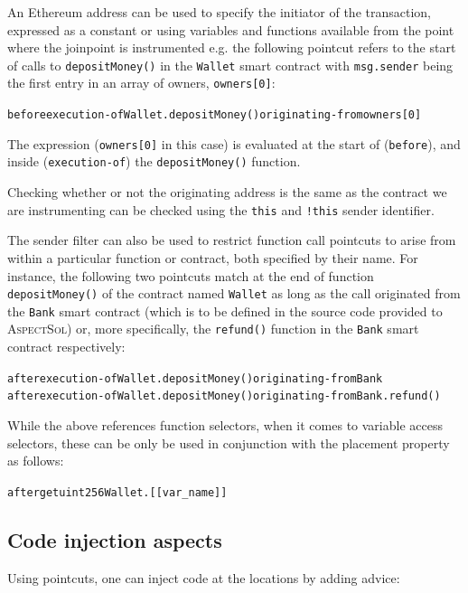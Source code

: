 \documentclass{article}
\newcommand{\AspectSol}{\textsc{AspectSol}\xspace}
\begin{document}
\begin{itemize}
    An Ethereum address can be used to specify the initiator of the transaction, expressed as a constant or using variables and functions available from the point where the joinpoint is instrumented e.g. the following pointcut refers to the start of calls to \texttt{depositMoney()} in the \texttt{Wallet} smart contract with \texttt{msg.sender} being the first entry in an array of owners, \texttt{owners[0]}:  

	\begin{alltt}
before execution-of Wallet.depositMoney() originating-from owners[0]
	\end{alltt}
	
	The expression (\texttt{owners[0]} in this case) is evaluated at the start of (\texttt{before}), and inside (\texttt{execution-of}) the \texttt{depositMoney()} function. 
	
	Checking whether or not the originating address is the same as the contract we are instrumenting can be checked using the \texttt{this} and \texttt{!this} sender identifier.
	
	The sender filter can also be used to restrict function call pointcuts to arise from within a particular function or contract, both specified by their name. For instance, the following two pointcuts match at the end of function \texttt{depositMoney()} of the contract named \texttt{Wallet} as long as the call originated from the \texttt{Bank} smart contract (which is to be defined in the source code provided to \AspectSol) or, more specifically, the \texttt{refund()} function in the \texttt{Bank} smart contract respectively:

    \begin{alltt}
after execution-of Wallet.depositMoney() originating-from Bank
after execution-of Wallet.depositMoney() originating-from Bank.refund()
    \end{alltt}
\end{itemize}

    While the above references function selectors, when it comes to variable access selectors, these can be only be used in conjunction with the placement property as follows:
    
    \begin{alltt}
after get uint256 Wallet.[[var\_name]]
    \end{alltt}



\subsection{Code injection aspects}
Using pointcuts, one can inject code at the locations by adding advice:
\end{document}
